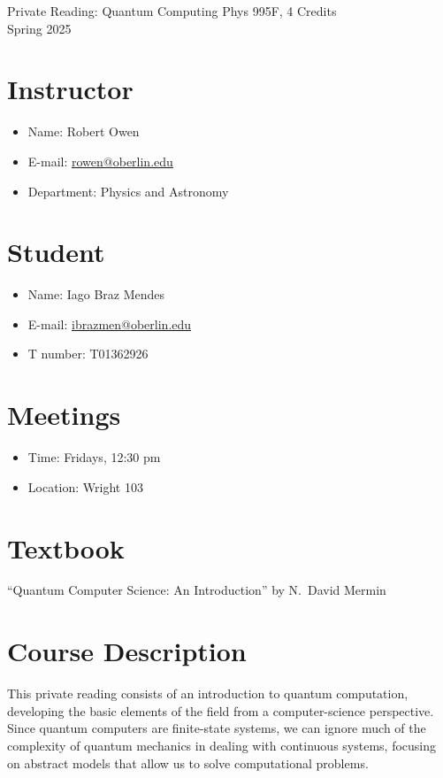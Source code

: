 \documentclass{../doc}
\begin{document}
  \header
    {Private Reading: Quantum Computing}
    {Phys 995F, 4 Credits \\ Spring 2025}

  \begin{multicols}{2}
    \section*{Instructor}
      \begin{itemize}
        \item Name: Robert Owen
        \item E-mail: \href{mailto:rowen@oberlin.edu}{rowen@oberlin.edu}
        \item Department: Physics and Astronomy
      \end{itemize}
    \columnbreak
    \section*{Student}
      \begin{itemize}
        \item Name: Iago Braz Mendes
        \item E-mail: \href{mailto:ibrazmen@oberlin.edu}{ibrazmen@oberlin.edu}
        \item T number: T01362926
    \end{itemize}
  \end{multicols}

  \begin{multicols}{2}
    \section*{Meetings}
      \begin{itemize}
        \item Time: Fridays, 12:30 pm
        \item Location: Wright 103
      \end{itemize}
    \columnbreak
    \section*{Textbook}
      ``Quantum Computer Science: An Introduction'' by N.~David Mermin
  \end{multicols}

  \section*{Course Description}
    This private reading consists of an introduction to quantum computation, developing the basic elements of the field from a computer-science perspective. Since quantum computers are finite-state systems, we can ignore much of the complexity of quantum mechanics in dealing with continuous systems, focusing on abstract models that allow us to solve computational problems.
  
\end{document}
